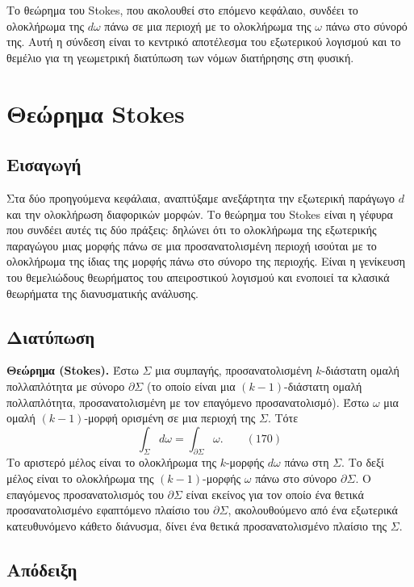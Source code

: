 \documentclass[12pt]{article}
\begin{document}
Το θεώρημα του Stokes, που ακολουθεί στο επόμενο κεφάλαιο, συνδέει το ολοκλήρωμα της $d\omega$ πάνω σε μια περιοχή με το ολοκλήρωμα της $\omega$ πάνω στο σύνορό της. Αυτή η σύνδεση είναι το κεντρικό αποτέλεσμα του εξωτερικού λογισμού και το θεμέλιο για τη γεωμετρική διατύπωση των νόμων διατήρησης στη φυσική.

\section{Θεώρημα Stokes}

\subsection{Εισαγωγή}

Στα δύο προηγούμενα κεφάλαια, αναπτύξαμε ανεξάρτητα την εξωτερική παράγωγο $d$ και την ολοκλήρωση διαφορικών μορφών. Το θεώρημα του Stokes είναι η γέφυρα που συνδέει αυτές τις δύο πράξεις: δηλώνει ότι το ολοκλήρωμα της εξωτερικής παραγώγου μιας μορφής πάνω σε μια προσανατολισμένη περιοχή ισούται με το ολοκλήρωμα της ίδιας της μορφής πάνω στο σύνορο της περιοχής. Είναι η γενίκευση του θεμελιώδους θεωρήματος του απειροστικού λογισμού και ενοποιεί τα κλασικά θεωρήματα της διανυσματικής ανάλυσης.

\subsection{Διατύπωση}

\textbf{Θεώρημα (Stokes).} Έστω $\Sigma$ μια συμπαγής, προσανατολισμένη $k$-διάστατη ομαλή πολλαπλότητα με σύνορο $\partial \Sigma$ (το οποίο είναι μια $(k-1)$-διάστατη ομαλή πολλαπλότητα, προσανατολισμένη με τον επαγόμενο προσανατολισμό). Έστω $\omega$ μια ομαλή $(k-1)$-μορφή ορισμένη σε μια περιοχή της $\Sigma$. Τότε
\begin{equation}
\int_\Sigma d\omega = \int_{\partial \Sigma} \omega. \qquad (170)
\end{equation}
Το αριστερό μέλος είναι το ολοκλήρωμα της $k$-μορφής $d\omega$ πάνω στη $\Sigma$. Το δεξί μέλος είναι το ολοκλήρωμα της $(k-1)$-μορφής $\omega$ πάνω στο σύνορο $\partial \Sigma$. Ο επαγόμενος προσανατολισμός του $\partial \Sigma$ είναι εκείνος για τον οποίο ένα θετικά προσανατολισμένο εφαπτόμενο πλαίσιο του $\partial \Sigma$, ακολουθούμενο από ένα εξωτερικά κατευθυνόμενο κάθετο διάνυσμα, δίνει ένα θετικά προσανατολισμένο πλαίσιο της $\Sigma$.

\subsection{Απόδειξη}
\end{document}
